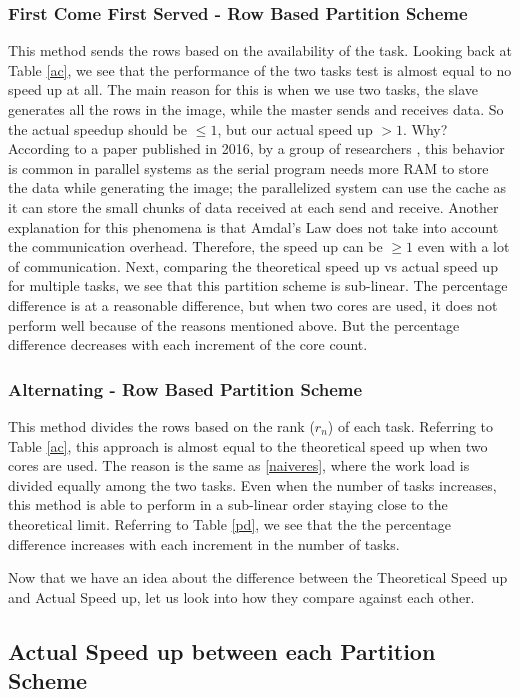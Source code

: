 \documentclass[conference]{IEEEtran}
\begin{document}
	\subsubsection{First Come First Served - Row Based Partition Scheme}
	This method sends the rows based on the availability of the task. Looking back at Table \ref{ac}, we see that the performance of the two tasks test is almost equal to no speed up at all. The main reason for this is when we use two tasks, the slave generates all the rows in the image, while the master sends and receives data. So the actual speedup should be $ \le 1$, but our actual speed up $> 1$. Why? According to a paper published in 2016, by a group of researchers \cite{ristov2016superlinear}, this behavior is common in parallel systems as the serial program needs more RAM to store the data while generating the image; the parallelized system can use the cache as it can store the small chunks of data received at each send and receive. Another explanation for this phenomena is that Amdal's Law does not take into account the communication overhead. Therefore, the speed up can be $\ge 1$ even with a lot of communication.	
	Next, comparing the theoretical speed up vs actual speed up for multiple tasks, we see that this partition scheme is sub-linear. The percentage difference is at a reasonable difference, but when two cores are used, it does not perform well because of the reasons mentioned above. But the percentage difference decreases with each increment of the core count.
	
	\subsubsection{Alternating - Row Based Partition Scheme}
	This method divides the rows based on the rank ($r_n$)  of each task. Referring to Table \ref{ac}, this approach is almost equal to the theoretical speed up when two cores are used. The reason is the same as \ref{naiveres}, where the work load is divided equally among the two tasks. Even when the number of tasks increases, this method is able to perform in a sub-linear order staying close to the theoretical limit. Referring to Table \ref{pd}, we see that the the percentage difference increases with each increment in the number of tasks.
	
	Now that we have an idea about the difference between the Theoretical Speed up and Actual Speed up, let us look into how they compare against each other.
	
	\subsection{Actual Speed up between each Partition Scheme}
	
\end{document}
